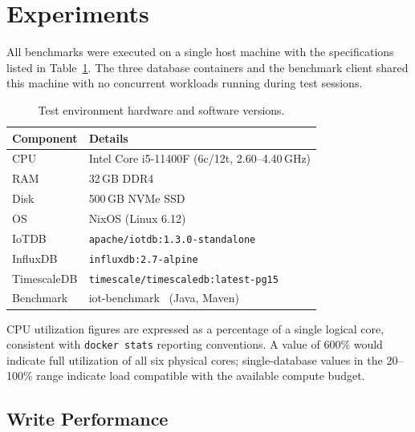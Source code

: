 \section{Experiments}
\label{sec:experiments}


All benchmarks were executed on a single host machine with the specifications listed in
Table~\ref{tab:hardware}. The three database containers and the benchmark client
shared this machine with no concurrent workloads running during test sessions.

\begin{table}[t]
  \centering
  \caption{Test environment hardware and software versions.}
  \label{tab:hardware}
  \begin{tabular}{ll}
    \hline
    \textbf{Component} & \textbf{Details} \\
    \hline
    CPU       & Intel Core i5-11400F (6c/12t, 2.60--4.40\,GHz) \\
    RAM       & 32\,GB DDR4 \\
    Disk      & 500\,GB NVMe SSD \\
    OS        & NixOS (Linux 6.12) \\
    \hline
    IoTDB       & \texttt{apache/iotdb:1.3.0-standalone} \\
    InfluxDB    & \texttt{influxdb:2.7-alpine} \\
    TimescaleDB & \texttt{timescale/timescaledb:latest-pg15} \\
    Benchmark   & iot-benchmark~\cite{iotbenchmark} (Java, Maven) \\
    \hline
  \end{tabular}
\end{table}

CPU utilization figures are expressed as a percentage of a single logical core, consistent
with \texttt{docker stats} reporting conventions. A value of 600\% would indicate full
utilization of all six physical cores; single-database values in the 20--100\% range
indicate load compatible with the available compute budget.

\subsection{Write Performance}
\label{sec:write-results}

